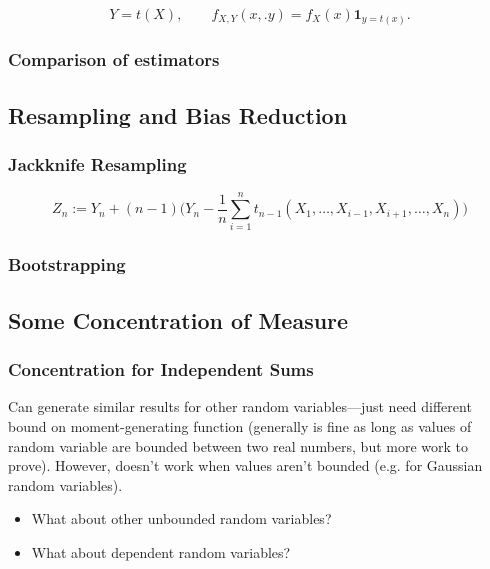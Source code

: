 \begin{remark}

\[
Y = t(X), \qquad f_{X,Y}(x,.y) = f_X(x) \boldsymbol{1}_{y=t(x)}.
\]

\end{remark}

\subsubsection{Comparison of estimators}

\subsection{Resampling and Bias Reduction}

\subsubsection{Jackknife Resampling}

\[
Z_n :=  Y_n + (n-1) \bigg(Y_n - \frac{1}{n} \sum_{i=1}^n t_{n-1}(X_1, \ldots, X_{i-1}, X_{i+1}, \ldots, X_n) \bigg) 
\]

\subsubsection{Bootstrapping}

\subsection{Some Concentration of Measure}

\subsubsection{Concentration for Independent Sums}

Can generate similar results for other random variables---just need different bound on moment-generating function (generally is fine as long as values of random variable are bounded between two real numbers, but more work to prove). However, doesn't work when values aren't bounded (e.g. for Gaussian random variables).

\begin{itemize}

\item What about other unbounded random variables?

\item What about dependent random variables?

\end{itemize}

